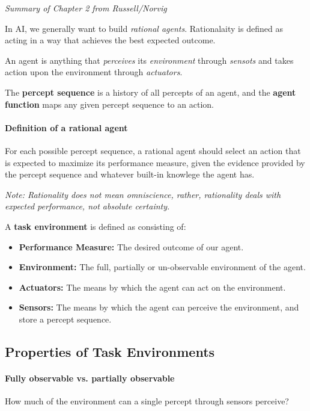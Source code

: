 \textit{Summary of Chapter 2 from Russell/Norvig}

In AI, we generally want to build \textit{rational agents}. Rationalaity is defined as acting in a way that achieves the best expected outcome.

An agent is anything that \textit{perceives} its \textit{environment} through \textit{sensots} and takes action upon the environment through \textit{actuators}.

The \textbf{percept sequence} is a history of all percepts of an agent, and the \textbf{agent function} maps any given percept sequence to an action.

\paragraph{Definition of a rational agent} For each possible percept sequence, a rational agent should select an action that is expected to maximize its performance measure, given the evidence provided by the percept sequence and whatever built-in knowlege the agent has.

\textit{Note: Rationality does not mean omniscience, rather, rationality deals with expected performance, not absolute certainty.}

A \textbf{task environment} is defined as consisting of:

\begin{itemize}
    \item \textbf{Performance Measure:} The desired outcome of our agent.
    \item \textbf{Environment:} The full, partially or un-observable environment of the agent.
    \item \textbf{Actuators:} The means by which the agent can act on the environment. 
    \item \textbf{Sensors:} The means by which the agent can perceive the environment, and store a percept sequence.
\end{itemize}

\subsection{Properties of Task Environments}

\paragraph{Fully observable vs. partially observable} How much of the environment can a single percept through sensors perceive?

